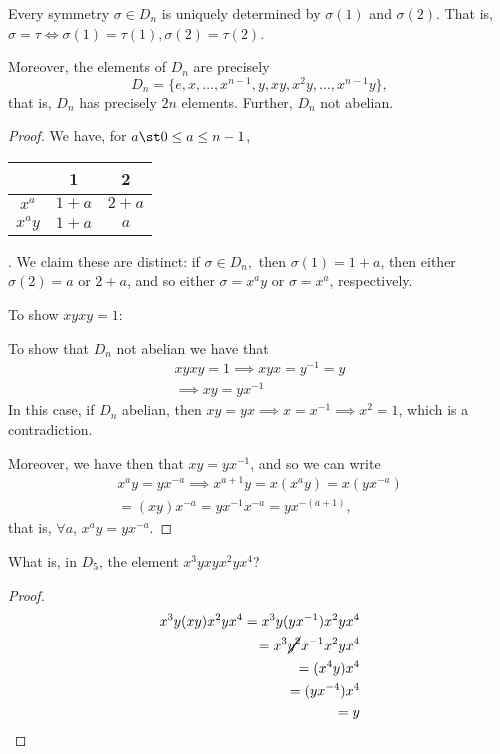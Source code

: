 \documentclass[12pt,oneside]{article}
\begin{document}
\begin{proposition}
  Every symmetry $\sigma \in D_n$ is uniquely determined by $\sigma (1)$ and $\sigma (2)$. That is, $\sigma = \tau \iff \sigma(1) = \tau(1), \sigma(2) = \tau(2)$.
  
  Moreover, the elements of $D_n$ are precisely \[
  D_n = \{
    e, x, \dots, x^{n-1}, y, xy, x^2y, \dots, x^{n-1}y
  \},  
  \]
  that is, $D_n$ has precisely $2n$ elements. Further, $D_n$ not abelian.
\footnotemark
\end{proposition}
\begin{proof}
  We have, for $a \st 0 \leq a \leq n -1$,
  \begin{tabular}{c|cc}
    & 1 & 2\\
    \hline
    $x^a$ & $1 + a$ & $2 + a$\\
    $x^{a}y$ & $1 + a$ & $a$
  \end{tabular}. We claim these are distinct: if $\sigma \in D_n,$ then $\sigma(1) = 1 + a$, then either $\sigma(2) = a$ or $2 + a$, and so either $\sigma = x^ay$ or $\sigma = x^a$, respectively.

  To show $xyxy = 1$: %

  To show that $D_n$ not abelian we have that \begin{align*}
    xyxy = 1 \implies xyx = y^{-1} = y\\
    \implies xy = yx^{-1}
  \end{align*}
  In this case, if $D_n$ abelian, then $xy = yx \implies x = x^{-1} \implies x^2 = 1$, which is a contradiction.

  Moreover, we have then that $xy = yx^{-1}$, and so we can write \begin{align*}
    x^ay = yx^{-a} \implies x^{a+1}y = x(x^ay) = x(yx^{-a})\\
    = (xy)x^{-a} = yx^{-1}x^{-a} = yx^{-(a+1)},
  \end{align*}
  that is, $\forall a$, $x^{a}y = yx^{-a}$.
\end{proof}

\begin{example}[In $D_5$]
  What is, in $D_5$, the element $x^3yxyx^2yx^4$?
  \begin{proof}
    \begin{align*}
      x^3y(xy)x^2yx^4 = x^3y(yx^{-1})x^2yx^4\\
      =x^3\cancel{y^2}x^{-1}x^2yx^4 \\
      = (x^4y)x^4\\ 
      = (yx^{-4})x^4\\
      = y
    \end{align*}
  \end{proof}
\end{example}
\end{document}
